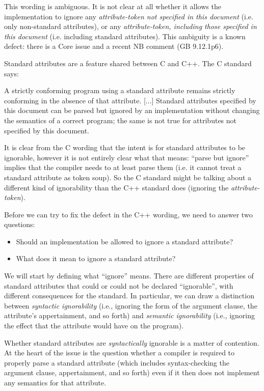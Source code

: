 This wording is ambiguous. It is not clear at all whether it allows the implementation to ignore any  \emph{attribute-token not specified in this document} (i.e. only non-standard attributes), or any  \emph{attribute-token, including those specified in this document} (i.e. including standard attributes). This ambiguity is a known defect: there is a Core issue \cite{CWG2538} and a recent NB comment (GB 9.12.1p6).

Standard attributes are a feature shared between C and C++. The C standard says:

\begin{adjustwidth}{0.5cm}{0.5cm}
A strictly conforming program using a standard attribute remains
strictly conforming in the absence of that attribute. [...] Standard attributes specified by this document can be parsed but ignored by an implementation without changing the semantics of a correct program; the same is not true for attributes not specified by this document.
\end{adjustwidth}

It is clear from the C wording that the intent is for standard attributes to be ignorable, however it is not entirely clear what that means: ``parse but ignore'' implies that the compiler needs to at least parse them (i.e. it cannot treat a standard attribute as token soup). So the C standard might be talking about a different kind of ignorability than the C++ standard does (ignoring the \emph{attribute-token}).

Before we can try to fix the defect in the C++ wording, we need to answer two questions:

\begin{itemize}
\item Should an implementation be allowed to ignore a standard attribute?
\item What does it mean to ignore a standard attribute?
\end{itemize}

We will start by defining what ``ignore'' means. There are different properties of standard attributes that could or could not be declared ``ignorable'', with different consequences for the standard. In particular, we can draw a distinction between \emph{syntactic ignorability} (i.e., ignoring the form of the argument clause, the attribute's appertainment, and so forth) and \emph{semantic ignorability} (i.e., ignoring the effect that the attribute would have on the program).

Whether standard attributes are \emph{syntactically} ignorable is a matter of contention. At the heart of the issue is the question whether a compiler is required to properly parse a standard attribute (which includes syntax-checking the argument clause, appertainment, and so forth) even if it then does not implement any semantics for that attribute.

